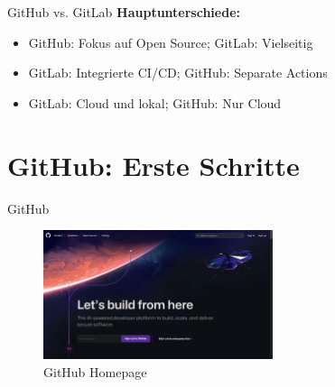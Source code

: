 \documentclass[compress,aspectratio=169]{beamer}
\begin{document}
	\begin{frame}{GitHub vs. GitLab}
		\textbf{Hauptunterschiede:}
		\begin{itemize}
			\item GitHub: Fokus auf Open Source; GitLab: Vielseitig
			\item GitLab: Integrierte CI/CD; GitHub: Separate Actions
			\item GitLab: Cloud und lokal; GitHub: Nur Cloud
		\end{itemize}
	\end{frame}
		

	\section{GitHub: Erste Schritte}
	
	\begin{frame}{GitHub}
		\begin{figure}
			\includegraphics[width=0.6\textwidth]{assets/github/github-home.jpg}
			\caption{GitHub Homepage}
		\end{figure}
	\end{frame}
\end{document}
